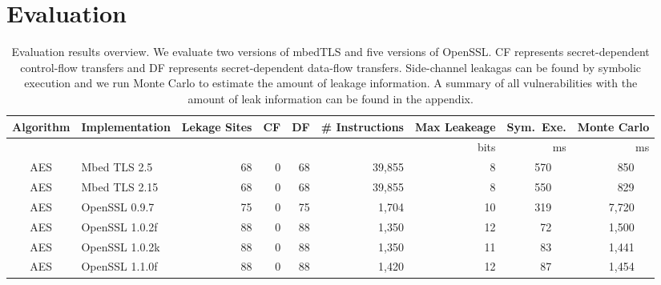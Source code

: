 \section{Evaluation}
\label{res_overview}

\begin{table}
    \centering
    \caption{Evaluation results overview. We evaluate two versions of mbedTLS and five
        versions of OpenSSL\@. CF represents secret-dependent control-flow transfers and
        DF represents secret-dependent data-flow transfers. Side-channel leakagas can
        be found by symbolic execution and we run Monte Carlo to estimate the amount
        of leakage information. A summary of all vulnerabilities with the amount of
        leak information can be found in the appendix.
    }\label{fig:Testtt}
    \begin{tabular}{clrrrrrrr}
        \hline
        \textbf{Algorithm} & \textbf{Implementation}  & \textbf{Lekage Sites} & \textbf{CF}         & \textbf{DF}
                           & \textbf{\# Instructions} & \textbf{Max Leakeage} & \textbf{Sym.\ Exe.} & \textbf{Monte Carlo}                                                     \\\hline
                           &                          &                       &                     &                      &             & bits & ms         & ms              \\\cline{7-9}
        AES                & Mbed TLS 2.5             & 68                    & 0                   & 68                   & 39,855      & 8    & 570 ~~     & 850 ~~          \\
        AES                & Mbed TLS 2.15            & 68                    & 0                   & 68                   & 39,855      & 8    & 550 ~~     & 829 ~~          \\
        AES                & OpenSSL 0.9.7            & 75                    & 0                   & 75                   & 1,704       & 10   & 319 ~~     & 7,720 ~~        \\
        AES                & OpenSSL 1.0.2f           & 88                    & 0                   & 88                   & 1,350       & 12   & 72 ~~      & 1,500 ~~        \\
        AES                & OpenSSL 1.0.2k           & 88                    & 0                   & 88                   & 1,350       & 11   & 83 ~~      & 1,441 ~~        \\
        AES                & OpenSSL 1.1.0f           & 88                    & 0                   & 88                   & 1,420       & 12   & 87 ~~      & 1,454 ~~        \\

\end{tabular}
\end{table}
